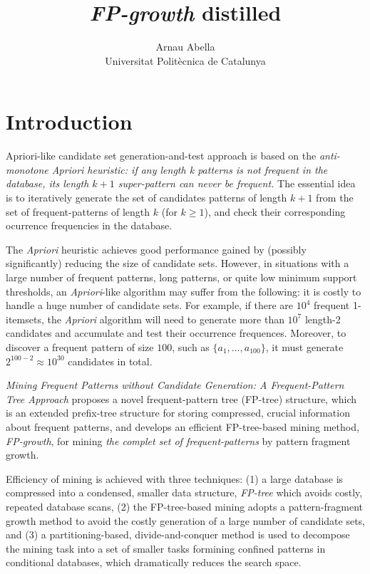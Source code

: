 \documentclass[12pt, a4paper]{article}
\title{%
  \textit{FP-growth} distilled
}
\author{%
  Arnau Abella \\
  \small{Universitat Polit\`ecnica de Catalunya}
}
\begin{document}
\maketitle

\section{Introduction}

Apriori-like candidate set generation-and-test approach is based on the \textit{anti-monotone Apriori heuristic: if any length k patterns is not frequent in the database, its length $k + 1$ super-pattern can never be frequent.} The essential idea is to iteratively generate the set of candidates patterns of length $k+1$ from the set of frequent-patterns of length $k$ (for $k \geq 1$), and check their corresponding ocurrence frequencies in the database.

The \textit{Apriori} heuristic achieves good performance gained by (possibly \\ significantly) reducing the size of candidate sets. However, in situations with a large number of frequent patterns, long patterns, or quite low minimum support thresholds, an \textit{Apriori}-like algorithm may suffer from the following: it is costly to handle a huge number of candidate sets. For example, if there are $10^4$ frequent 1-itemsets, the \textit{Apriori} algorithm will need to generate more than $10^7$ length-2 candidates and accumulate and test their occurrence frequences. Moreover, to discover a frequent pattern of size $100$, such as $\{ a_1, \ldots , a_{100}\}$, it must generate $2^{100-2} \approx 10^{30}$ candidates in total.

\textit{Mining Frequent Patterns without Candidate Generation: A Frequent-Pattern Tree Approach} \cite{han2000} proposes a novel frequent-pattern tree (FP-tree) structure, which is an extended prefix-tree structure for storing compressed, crucial information about frequent patterns, and develops an efficient FP-tree-based mining method, \textit{FP-growth}, for mining \textit{the complet set of frequent-patterns} by pattern fragment growth.

Efficiency of mining is achieved with three techniques: (1) a large database is compressed into a condensed, smaller data structure, \textit{FP-tree} which avoids costly, repeated database scans, (2) the FP-tree-based mining adopts a pattern-fragment growth method to avoid the costly generation of a large number of candidate sets, and (3) a partitioning-based, divide-and-conquer method is used to decompose the mining task into a set of smaller tasks formining confined patterns in conditional databases, which dramatically reduces the search space.
\end{document}
